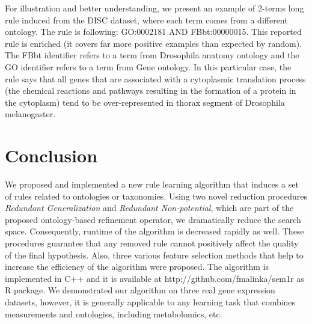 \documentclass{bmcart}
\begin{document}
For illustration and better understanding, we present an example of 2-terms long rule induced from the DISC dataset, where each term comes from a different ontology. The rule is following: GO:0002181 AND FBbt:00000015. This reported rule is enriched (it covers far more positive examples than expected by random). The FBbt identifier refers to a term from Drosophila anatomy ontology and the GO identifier refers to a term from Gene ontology. In this particular case, the rule says that all genes that are associated with a cytoplasmic translation process (the chemical reactions and pathways resulting in the formation of a protein in the cytoplasm) tend to be over-represented in thorax segment of Drosophila melanogaster.



\section*{Conclusion}

We proposed and implemented a new rule learning algorithm that induces a set of rules related to ontologies or taxonomies. Using two novel reduction procedures \emph{Redundant Generalization} and \emph{Redundant Non-potential}, which are part of the proposed ontology-based refinement operator, we dramatically reduce the search space. Consequently, runtime of the algorithm is decreased rapidly as well. These procedures guarantee that any removed rule cannot positively affect the quality of the final hypothesis. Also, three various feature selection methods that help to increase the efficiency of the algorithm were proposed.
The algorithm is implemented in C++ and it is available at http://github.com/fmalinka/sem1r as R package. We demonstrated our algorithm on three real gene expression datasets, however, it is generally applicable to any learning task that combines measurements and ontologies, including metabolomics, etc.



\end{document}
